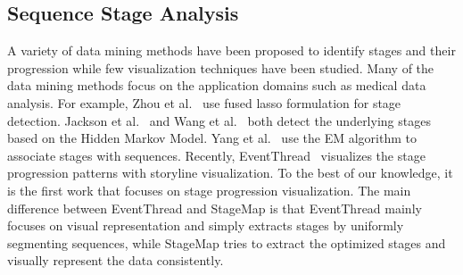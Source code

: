 \subsection{Sequence Stage Analysis}

A variety of data mining methods have been proposed to identify stages and their progression while few visualization techniques have been studied. Many of the data mining methods focus on the application domains such as medical data analysis. For example, Zhou et al.~\cite{zhou2013modeling} use fused lasso formulation for stage detection. Jackson et al.~\cite{jackson2003multistate} and Wang et al.~\cite{lu2016exploring} both detect the underlying stages based on the Hidden Markov Model. Yang et al.~\cite{yang2014finding} use the EM algorithm to associate stages with sequences. Recently, EventThread~\cite{guo2018eventthread} visualizes the stage progression patterns with storyline visualization. To the best of our knowledge, it is the first work that focuses on stage progression visualization. The main difference between EventThread and StageMap is that EventThread mainly focuses on visual representation and simply extracts stages by uniformly segmenting sequences, while StageMap tries to extract the optimized stages and visually represent the data consistently. 

